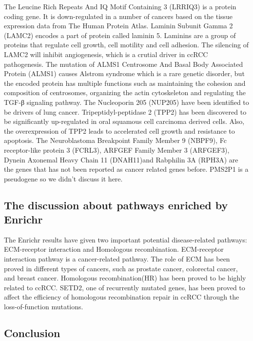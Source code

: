 The Leucine Rich Repeats And IQ Motif Containing 3 (LRRIQ3) is a protein coding gene. It is down-regulated in a number of cancers based on the tissue expression data from The Human Protein Atlas. Laminin Subunit Gamma 2 (LAMC2) encodes a part of protein called laminin 5. Laminins are a group of proteins that regulate cell growth, cell motility and cell adhesion. The silencing of LAMC2 will inhibit angiogenesis, which is a crutial driver in ccRCC pathogenesis\cite{pei_silencing_2019}\cite{seles_long_2020}. The mutation of ALMS1 Centrosome And Basal Body Associated Protein (ALMS1) causes Alstrom syndrome which is a rare genetic disorder, but the encoded protein has multiple functions such as maintaining the cohesion and composition of centrosomes, organizing the actin cytoskeleton\cite{hearn_alms1_2019} and regulating the TGF-β signaling pathway\cite{alvarez-satta_alms1_2021}. The Nucleoporin 205 (NUP205) have been identified to be drivers of lung cancer\cite{fujitomo_critical_2012}. Tripeptidyl-peptidase 2 (TPP2) has been discovered to be significantly up-regulated in oral squamous cell carcinoma derived cells. Also, the overexpression of TPP2 leads to accelerated cell growth and resistance to apoptosis\cite{tomkinson_tripeptidyl-peptidase_2019}. The Neuroblastoma Breakpoint Family Member 9 (NBPF9), Fc receptor-like protein 3 (FCRL3), ARFGEF Family Member 3 (ARFGEF3), Dynein Axonemal Heavy Chain 11 (DNAH11)and Rabphilin 3A (RPH3A) are the genes that has not been reported as cancer related genes before. PMS2P1 is a pseudogene so we didn't discuss it here. 

\subsection{The discussion about pathways enriched by Enrichr}
The Enrichr results have given two important potential disease-related pathways: ECM-receptor interaction and Homologous recombination. ECM-receptor interaction pathway is a cancer-related pathway. The role of ECM has been proved in different types of cancers, such as prostate cancer, colorectal cancer, and breast cancer\cite{bao_transcriptome_2019}. Homologous recombination(HR) has been proved to be highly related to ccRCC. SETD2, one of recurrently mutated genes, has been proved to affect the efficiency of homologous recombination repair in ccRCC through the loss-of-function mutations\cite{kanu_setd2_2015}. 

\subsection{Conclusion}

